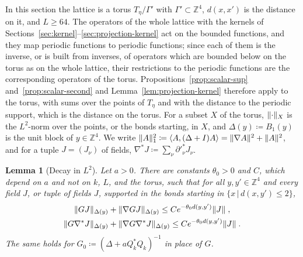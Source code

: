 \documentclass[11pt]{preprint}
\DeclarePairedDelimiter{\norm}{\lVert}{\rVert}
\numberwithin{equation}{section}
\newtheorem{lemma}[theorem]{Lemma}
\theoremstyle{definition}
\theoremstyle{remark}
\theoremstyle{plain}
\begin{document}
In this section the lattice is a torus $T_\eta/\Gamma'$ with $\Gamma' \subset \mathbb Z^4$, $d(x, x')$ is the distance on it, and $L \geq 64$. The operators of the whole lattice with the kernels of Sections~\ref{sec:kernel}--\ref{sec:projection-kernel} act on the bounded functions, and they map periodic functions to periodic functions; since each of them is the inverse, or is built from inverses, of operators which are bounded below on the torus as on the whole lattice, their restrictions to the periodic functions are the corresponding operators of the torus. Propositions~\ref{prop:scalar-sup} and~\ref{prop:scalar-second} and Lemma~\ref{lem:projection-kernel} therefore apply to the torus, with sums over the points of $T_\eta$ and with the distance to the periodic support, which is the distance on the torus. For a subset $X$ of the torus, $\norm{\cdot}_X$ is the $L^2$-norm over the points, or the bonds starting, in $X$, and $\Delta(y) \coloneqq B_1(y)$ is the unit block of $y \in \mathbb Z^4$. We write $\norm{A}_1^2 \coloneqq \langle A, (\Delta + I)A\rangle = \norm{\nabla A}^2 + \norm{A}^2$, and for a tuple $J = (J_\nu)$ of fields, $\nabla^*J \coloneqq \sum_\nu\partial'^*_\nu J_\nu$.

\begin{lemma}[Decay in $L^2$]\label{lem:l2-decay}
Let $a > 0$. There are constants $\theta_0 > 0$ and $C$, which depend on $a$ and not on $k$, $L$, and the torus, such that for all $y, y' \in \mathbb Z^4$ and every field $J$, or tuple of fields $J$, supported in the bonds starting in $\{ x \, | \, d(x, y') \leq 2 \}$,
\begin{equation}\label{eq:l2-decay}
\begin{gathered}
    \norm{GJ}_{\Delta(y)} + \norm{\nabla GJ}_{\Delta(y)} \leq Ce^{-\theta_0d(y, y')}\norm{J}\;,\\
    \norm{G\nabla^*J}_{\Delta(y)} + \norm{\nabla G\nabla^*J}_{\Delta(y)} \leq Ce^{-\theta_0d(y, y')}\norm{J}\;.
\end{gathered}
\end{equation}
The same holds for $G_0 \coloneqq (\Delta + aQ_k^*Q_k)^{-1}$ in place of $G$.
\end{lemma}
\end{document}
